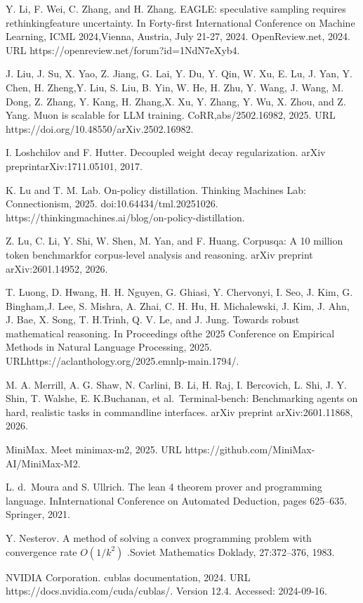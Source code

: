 \documentclass[
  10
]{article}
\begin{document}
Y. Li, F. Wei, C. Zhang, and H. Zhang. EAGLE: speculative sampling
requires rethinkingfeature uncertainty. In Forty-first International
Conference on Machine Learning, ICML 2024,Vienna, Austria, July 21-27,
2024. OpenReview.net, 2024. URL
https://openreview.net/forum?id=1NdN7eXyb4.

J. Liu, J. Su, X. Yao, Z. Jiang, G. Lai, Y. Du, Y. Qin, W. Xu, E. Lu, J.
Yan, Y. Chen, H. Zheng,Y. Liu, S. Liu, B. Yin, W. He, H. Zhu, Y. Wang,
J. Wang, M. Dong, Z. Zhang, Y. Kang, H. Zhang,X. Xu, Y. Zhang, Y. Wu, X.
Zhou, and Z. Yang. Muon is scalable for LLM training.
CoRR,abs/2502.16982, 2025. URL
https://doi.org/10.48550/arXiv.2502.16982.

I. Loshchilov and F. Hutter. Decoupled weight decay regularization.
arXiv preprintarXiv:1711.05101, 2017.

K. Lu and T. M. Lab. On-policy distillation. Thinking Machines Lab:
Connectionism, 2025. doi:10.64434/tml.20251026.
https://thinkingmachines.ai/blog/on-policy-distillation.

Z. Lu, C. Li, Y. Shi, W. Shen, M. Yan, and F. Huang. Corpusqa: A 10
million token benchmarkfor corpus-level analysis and reasoning. arXiv
preprint arXiv:2601.14952, 2026.

T. Luong, D. Hwang, H. H. Nguyen, G. Ghiasi, Y. Chervonyi, I. Seo, J.
Kim, G. Bingham,J. Lee, S. Mishra, A. Zhai, C. H. Hu, H. Michalewski, J.
Kim, J. Ahn, J. Bae, X. Song, T. H.Trinh, Q. V. Le, and J. Jung. Towards
robust mathematical reasoning. In Proceedings ofthe 2025 Conference on
Empirical Methods in Natural Language Processing, 2025.
URLhttps://aclanthology.org/2025.emnlp-main.1794/.

M. A. Merrill, A. G. Shaw, N. Carlini, B. Li, H. Raj, I. Bercovich, L.
Shi, J. Y. Shin, T. Walshe, E. K.Buchanan, et al.~Terminal-bench:
Benchmarking agents on hard, realistic tasks in commandline interfaces.
arXiv preprint arXiv:2601.11868, 2026.

MiniMax. Meet minimax-m2, 2025. URL
https://github.com/MiniMax-AI/MiniMax-M2.

L. d.~Moura and S. Ullrich. The lean 4 theorem prover and programming
language. InInternational Conference on Automated Deduction, pages
625--635. Springer, 2021.

Y. Nesterov. A method of solving a convex programming problem with
convergence rate \(O ( 1 / k ^ { 2 } )\) .Soviet Mathematics Doklady,
27:372--376, 1983.

NVIDIA Corporation. cublas documentation, 2024. URL
https://docs.nvidia.com/cuda/cublas/. Version 12.4. Accessed:
2024-09-16.
\end{document}
